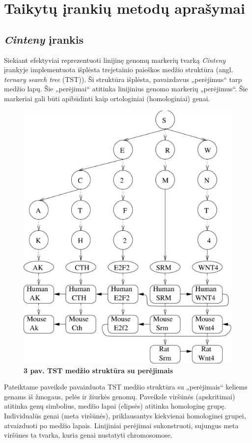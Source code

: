 \documentclass[12pt]{article}
\begin{document}
\newpage


\section{Taikytų įrankių metodų aprašymai}
\subsection{\emph{Cinteny} įrankis}
Siekiant efektyviai reprezentuoti linijinę genomų markerių tvarką
\emph{Cinteny}\cite{CINTENY} įrankyje
implementuota išplėsta trejetainio paieškos medžio struktūra \cite{TST}(angl.
\emph{ternary search tree} (TST)). Ši struktūra išplėsta, pavaizdavus 
„perėjimus“ tarp medžio lapų. Šie „perėjimai“ atitinka linijinius genomo
markerių „perėjimus“. Šie markeriai gali būti apibūdinti kaip ortologiniai
(homologiniai) genai.

\begin{figure}[htb]
    \begin{center}
        \includegraphics[width=0.4\linewidth]{../Figures/TTS_data_structure.png}
        \vspace{-0.5\baselineskip}
        \caption*{\small\textbf{3 pav. TST medžio struktūra su perėjimais}}
        \label{fig:3}
    \end{center}
\end{figure}

Pateiktame paveiksle pavaizduota TST medžio struktūra su „perėjimais“ keliems
genams iš žmogaus, pelės ir žiurkės genomų. Paveiksle viršūnės (apskritimai)
atitinka genų simbolius, medžio lapai (elipsės) atitinka homologinę grupę.
Individualūs genai (meta viršūnės), priklausantys kiekvienai homologinei grupei,
atvaizduoti po medžio lapais. Linijiniai perėjimai sukonstruoti, sujungus meta
viršūnes ta tvarka, kuria genai nustatyti chromosomose.
\end{document}
